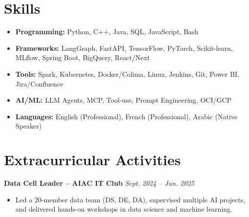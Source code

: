 \documentclass[11pt,a4paper]{article}
\newcommand{\resumeProject}[2]{
  \vspace{3pt}
  \noindent\textbf{#1} \hfill \textit{#2}
  \vspace{2pt}
}
\begin{document}
\section{Skills}
\begin{itemize}[label={}]
  \item \textbf{Programming:} Python, C++, Java, SQL, JavaScript, Bash
  \item \textbf{Frameworks:} LangGraph, FastAPI, TensorFlow, PyTorch, Scikit-learn, MLflow, Spring Boot, BigQuery, React/Next
  \item \textbf{Tools:} Spark, Kubernetes, Docker/Colima, Linux, Jenkins, Git, Power BI, Jira/Confluence
  \item \textbf{AI/ML:} LLM Agents, MCP, Tool-use, Prompt Engineering, OCI/GCP
  \item \textbf{Languages:} English (Professional), French (Professional), Arabic (Native Speaker)
\end{itemize}

\section{Extracurricular Activities}
\resumeProject{Data Cell Leader -- AIAC IT Club}{Sept. 2024 -- Jun. 2025}
\begin{itemize}
  \item Led a 20-member data team (DS, DE, DA), supervised multiple AI projects, and delivered hands-on workshops in data science and machine learning.
\end{itemize}
\end{document}
